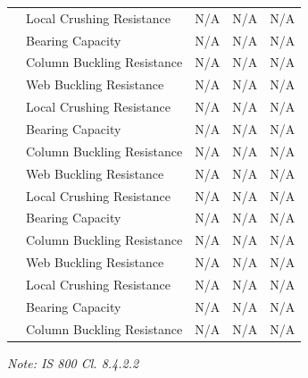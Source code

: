 \documentclass[12pt,a4paper]{report}
\numberwithin{table}{chapter}
\numberwithin{figure}{chapter}
\begin{document}
\begin{longtable}{|C{2.5cm}|L{3.5cm}|C{3.5cm}|>{\centering\arraybackslash}p{4.2cm}|C{1.8cm}|}
 & Local Crushing Resistance & N/A & N/A & N/A \\[6pt]
 & Bearing Capacity & N/A & N/A & N/A \\[6pt]
 & Column Buckling Resistance & N/A & N/A & N/A \\[6pt]
\hline
{} & Web Buckling Resistance & N/A & N/A & N/A \\[6pt]
 & Local Crushing Resistance & N/A & N/A & N/A \\[6pt]
 & Bearing Capacity & N/A & N/A & N/A \\[6pt]
 & Column Buckling Resistance & N/A & N/A & N/A \\[6pt]
\hline
{} & Web Buckling Resistance & N/A & N/A & N/A \\[6pt]
 & Local Crushing Resistance & N/A & N/A & N/A \\[6pt]
 & Bearing Capacity & N/A & N/A & N/A \\[6pt]
 & Column Buckling Resistance & N/A & N/A & N/A \\[6pt]
\hline
{} & Web Buckling Resistance & N/A & N/A & N/A \\[6pt]
 & Local Crushing Resistance & N/A & N/A & N/A \\[6pt]
 & Bearing Capacity & N/A & N/A & N/A \\[6pt]
 & Column Buckling Resistance & N/A & N/A & N/A \\[6pt]
\hline
\end{longtable}
\noindent\textit{Note: IS 800 Cl. 8.4.2.2}
\end{document}
